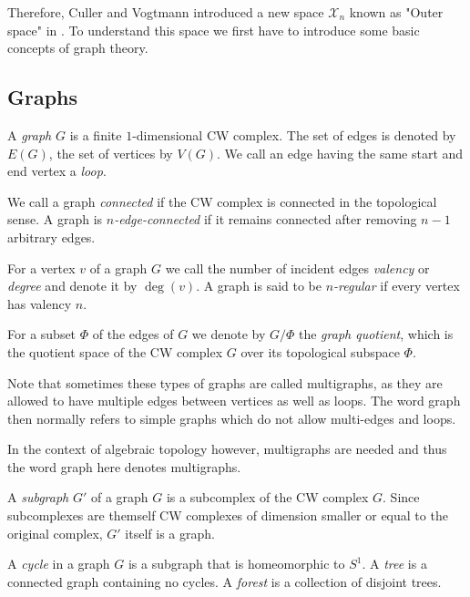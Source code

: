 Therefore, Culler and Vogtmann introduced a new space $\mathcal{X}_{n}$ known as "Outer space" in \cite{vogtmann86}.
To understand this space we first have to introduce some basic concepts of graph theory.

\subsection{Graphs}
\begin{definition}
	A \emph{graph} $G$ is a finite $1$-dimensional CW complex. The set of edges is denoted by $E(G)$, the set of vertices by  $V(G)$.
	We call an edge having the same start and end vertex a \emph{loop}.

	We call a graph \emph{connected} if the CW complex is connected in the topological sense.
	A graph is \emph{$n$-edge-connected} if it remains connected after removing  $n-1$ arbitrary edges.

	For a vertex $v$ of a graph  $G$ we call the number of incident edges \emph{valency} or \emph{degree} and denote it by $\deg(v)$.
	A graph is said to be \emph{$n$-regular} if every vertex has valency $n$.

	For a subset $\Phi$ of the edges of $G$ we denote by $G / \Phi$ the \emph{graph quotient}, which is the quotient space of the CW complex $G$ over its topological subspace $\Phi$.
\end{definition}

\begin{remark}
	Note that sometimes these types of graphs are called multigraphs, as they are allowed to have multiple edges between vertices as well as loops.
	The word graph then normally refers to simple graphs which do not allow multi-edges and loops.

	In the context of algebraic topology however, multigraphs are needed and thus the word graph here denotes multigraphs.
\end{remark}

\begin{definition}
	A \emph{subgraph} $G'$ of a graph $G$ is a subcomplex of the CW complex $G$. Since subcomplexes are themself CW complexes of dimension smaller or equal to the original complex,
	 $G'$ itself is a graph.

	 A \emph{cycle} in a graph $G$ is a subgraph that is homeomorphic to $S^1$. A \emph{tree} is a
	 connected graph containing no cycles. A \emph{forest} is a collection of disjoint trees.
\end{definition}


